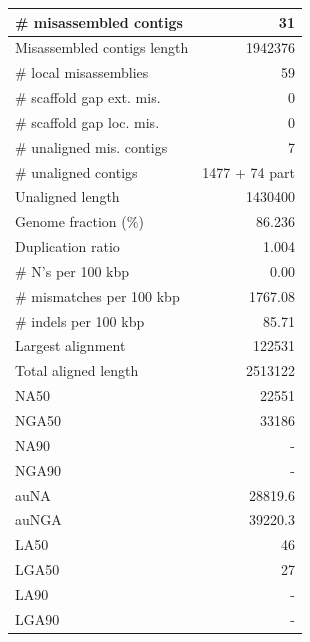 \documentclass[12pt,a4paper]{article}
\begin{document}
\begin{table}[ht]
\begin{center}
\begin{tabular}{|l*{1}{|r}|}
\# misassembled contigs & 31 \\ \hline
Misassembled contigs length & 1942376 \\ \hline
\# local misassemblies & 59 \\ \hline
\# scaffold gap ext. mis. & 0 \\ \hline
\# scaffold gap loc. mis. & 0 \\ \hline
\# unaligned mis. contigs & 7 \\ \hline
\# unaligned contigs & 1477 + 74 part \\ \hline
Unaligned length & 1430400 \\ \hline
Genome fraction (\%) & 86.236 \\ \hline
Duplication ratio & 1.004 \\ \hline
\# N's per 100 kbp & 0.00 \\ \hline
\# mismatches per 100 kbp & 1767.08 \\ \hline
\# indels per 100 kbp & 85.71 \\ \hline
Largest alignment & 122531 \\ \hline
Total aligned length & 2513122 \\ \hline
NA50 & 22551 \\ \hline
NGA50 & 33186 \\ \hline
NA90 & - \\ \hline
NGA90 & - \\ \hline
auNA & 28819.6 \\ \hline
auNGA & 39220.3 \\ \hline
LA50 & 46 \\ \hline
LGA50 & 27 \\ \hline
LA90 & - \\ \hline
LGA90 & - \\ \hline
\end{tabular}
\end{center}
\end{table}
\end{document}
